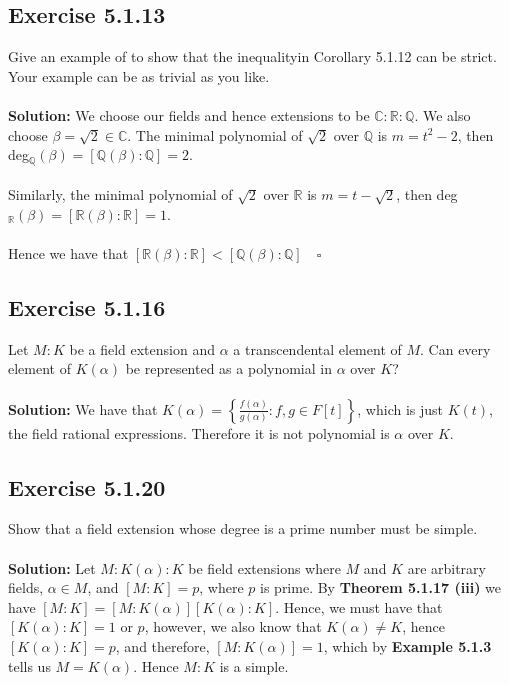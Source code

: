 \documentclass{article}
\begin{document}
\subsection*{Exercise 5.1.13}
Give an example of to show that the inequalityin Corollary 5.1.12 can be strict. Your example can be as trivial as you like.
\\\\
\textbf{Solution:}
We choose our fields and hence extensions to be $\mathbb{C}:\mathbb{R}:\mathbb{Q}$. We also choose $\beta = \sqrt2 \in \mathbb{C}$.
The minimal polynomial of $\sqrt2$ over $\mathbb{Q}$ is $m = t^2 - 2$, 
then deg$_\mathbb{Q}(\beta) = [\mathbb{Q}(\beta):\mathbb{Q}] = 2$.\\\\
Similarly, the minimal polynomial of $\sqrt2$ over $\mathbb{R}$ is $m = t - \sqrt2$, 
then deg$_\mathbb{R}(\beta) = [\mathbb{R}(\beta):\mathbb{R}] = 1$.\\\\
Hence we have that $[\mathbb{R}(\beta):\mathbb{R}] < [\mathbb{Q}(\beta):\mathbb{Q}] \quad \square$

\subsection*{Exercise 5.1.16}
Let $M:K$ be a field extension and $\alpha$ a transcendental element of $M$. Can every element of $K(\alpha)$ be represented
as a polynomial in $\alpha$ over $K$?
\\\\
\textbf{Solution:}
We have that $K(\alpha) = \left\{ \frac {f(\alpha)}{g(\alpha)} : f,g \in F[t]\right\}$, which is just $K(t)$, the field
rational expressions. Therefore it is not polynomial is $\alpha$ over $K$. 

\subsection*{Exercise 5.1.20}
Show that a field extension whose degree is a prime number must be simple.
\\\\
\textbf{Solution:}
Let $M:K(\alpha):K$ be field extensions where $M$ and $K$ are arbitrary fields, $\alpha \in M$, and $[M:K] = p$, where $p$ is prime. By \textbf{Theorem 5.1.17 (iii)} we have $[M:K] = [M:K(\alpha)][K(\alpha):K]$.
Hence, we must have that $[K(\alpha):K] = 1$ or $p$,
however, we also know that $K(\alpha) \neq K$, hence $[K(\alpha):K] = p$, and therefore,
$[M:K(\alpha)]=1$, which by \textbf{Example 5.1.3} tells us $M=K(\alpha)$.
Hence $M:K$ is a simple.
\end{document}
